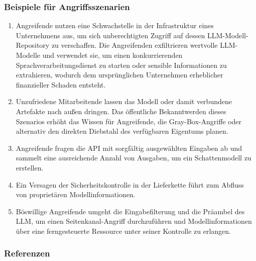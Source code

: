 \documentclass[
]{article}
\providecommand{\tightlist}{%
  \setlength{\itemsep}{0pt}\setlength{\parskip}{0pt}}
\begin{document}
\subsubsection{Beispiele für
Angriffsszenarien}\label{beispiele-fuxfcr-angriffsszenarien}

\begin{enumerate}
\def\labelenumi{\arabic{enumi}.}
\tightlist
\item
  Angreifende nutzen eine Schwachstelle in der Infrastruktur eines
  Unternehmens aus, um sich unberechtigten Zugriff auf dessen
  LLM-Modell-Repository zu verschaffen. Die Angreifenden exfiltrieren
  wertvolle LLM-Modelle und verwendet sie, um einen konkurrierenden
  Sprachverarbeitungsdienst zu starten oder sensible Informationen zu
  extrahieren, wodurch dem ursprünglichen Unternehmen erheblicher
  finanzieller Schaden entsteht.
\item
  Unzufriedene Mitarbeitende lassen das Modell oder damit verbundene
  Artefakte nach außen dringen. Das öffentliche Bekanntwerden dieses
  Szenarios erhöht das Wissen für Angreifende, die Gray-Box-Angriffe
  oder alternativ den direkten Diebstahl des verfügbaren Eigentums
  planen.
\item
  Angreifende fragen die API mit sorgfältig ausgewählten Eingaben ab und
  sammelt eine ausreichende Anzahl von Ausgaben, um ein Schattenmodell
  zu erstellen.
\item
  Ein Versagen der Sicherheitskontrolle in der Lieferkette führt zum
  Abfluss von proprietären Modellinformationen.
\item
  Böswillige Angreifende umgeht die Eingabefilterung und die Präambel
  des LLM, um einen Seitenkanal-Angriff durchzuführen und
  Modellinformationen über eine ferngesteuerte Ressource unter seiner
  Kontrolle zu erlangen.
\end{enumerate}

\subsubsection{Referenzen}\label{referenzen}
\end{document}
